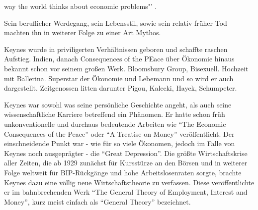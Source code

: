 way the world thinks about economic problems"' \parencite[S.13]{Warsh}. 

Sein beruflicher Werdegang, sein Lebensstil, sowie sein relativ früher Tod machten ihn in weiterer Folge zu einer Art Mythos.


Keynes wurde in priviligerten Verhältnissen geboren und schaffte raschen Aufstieg.
 Indien, danach Consequences of the PEace über Ökonomie hinaus bekannt schon vor seinem großen Werk. Bloomsbury Group, Bisexuell. Hochzeit mit Ballerina. Superstar der Ökonomie und Lebemann und so wird er auch dargestellt. Zeitgenossen litten darunter Pigou, Kalecki, Hayek, Schumpeter. 




Keynes war sowohl was seine persönliche Geschichte angeht, als auch seine wissenschaftliche Karriere betreffend ein Phänomen. Er hatte schon früh unkonventionelle und durchaus bedeutende Arbeiten wie \textcite{Keynes1919} "`The Economic Consequences of the Peace"' oder \textcite{Keynes1930} "`A Treatise on Money"' veröffentlicht. Der einschneidende Punkt war - wie für so viele Ökonomen, jedoch im Falle von Keynes noch ausgeprägter - die "`Great Depression"'. Die größte Wirtschaftskrise aller Zeiten,  die ab 1929 zunächst für Kursstürze an den Börsen und in weiterer Folge weltweit für BIP-Rückgänge und hohe Arbeitslosenraten sorgte, brachte Keynes dazu eine völlig neue Wirtschaftstheorie zu verfassen. Diese veröffentlichte er im bahnbrechenden Werk \textcite{Keynes1936} "`The General Theory of Employment, Interest and Money"', kurz meist einfach als "`General Theory"' bezeichnet. 


